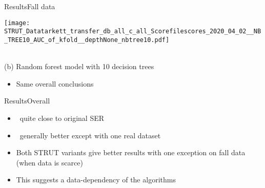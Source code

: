 \begin{frame}{Results}{Fall data}
\begin{minipage}[t]{0.49\linewidth}
        \begin{minipage}[t]{\ratio\linewidth}\vspace{0cm}
        \centerline{\texttt{[image: STRUT\_Datatarkett\_transfer\_db\_all\_c\_all\_Scorefilescores\_2020\_04\_02\_\_NB\_TREE10\_AUC\_of\_kfold\_\_depthNone\_nbtree10.pdf]}}
        \end{minipage}\\
        {\small(b)\; Random forest model with 10 decision trees}
        \begin{minipage}[t]{0.9\linewidth}\vspace{0pt}
            \begin{itemize}
                \item Same overall conclusions
            \end{itemize}
        \end{minipage}
    \end{minipage}

\end{frame}

\begin{frame}{Results}{Overall}

    
    \vspace{1cm}
    \centering
    \begin{minipage}[t]{0.8\linewidth}
        \begin{itemize}
            \item \serll\ quite close to original SER
            \item \serr\ generally better except with one real dataset
            \item Both STRUT variants give better results with one exception on fall data (when data is scarce)
            \item This suggests a data-dependency of the algorithms
        \end{itemize}
    \end{minipage}
    
\end{frame}


